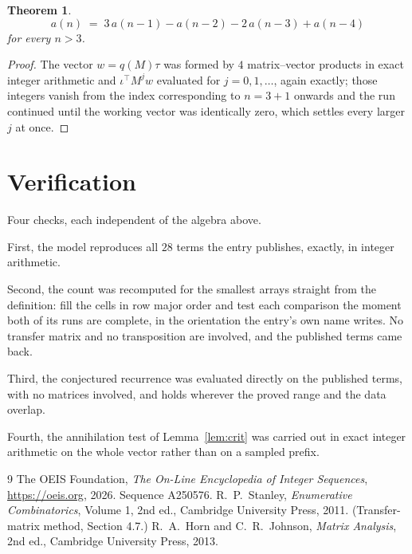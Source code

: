 \documentclass[11pt,a4paper]{article}
\theoremstyle{plain}
\newtheorem{theorem}{Theorem}
\theoremstyle{definition}
\begin{document}
\begin{theorem}
\[
a(n)\;=\;3\,a(n-1) - a(n-2) - 2\,a(n-3) + a(n-4)
\]
for every $n>3$.
\end{theorem}

\begin{proof}
The vector $w=q(M)\tau$ was formed by $4$ matrix--vector products in exact integer
arithmetic and $\iota^{\!\top}M^{j}w$ evaluated for $j=0,1,\dots$, again exactly; those
integers vanish from the index corresponding to $n=3+1$ onwards and the run continued
until the working vector was identically zero, which settles every larger $j$ at once.
\end{proof}

\section{Verification}

Four checks, each independent of the algebra above.

First, the model reproduces all $28$ terms the entry publishes, exactly, in integer
arithmetic.

Second, the count was recomputed for the smallest arrays straight from the definition: fill the
cells in row major order and test each comparison the moment both of its runs are complete,
in the orientation the entry's own name writes. No transfer matrix and no transposition are
involved, and the published terms came back.

Third, the conjectured recurrence was evaluated directly on the published terms, with no
matrices involved, and holds wherever the proved range and the data overlap.

Fourth, the annihilation test of Lemma~\ref{lem:crit} was carried out in exact integer
arithmetic on the whole vector rather than on a sampled prefix.

\begin{thebibliography}{9}
 The OEIS Foundation, \emph{The On-Line Encyclopedia of Integer
Sequences}, \url{https://oeis.org}, 2026. Sequence A250576.
 R.~P.~Stanley, \emph{Enumerative Combinatorics}, Volume 1, 2nd ed.,
Cambridge University Press, 2011. (Transfer-matrix method, Section 4.7.)
 R.~A.~Horn and C.~R.~Johnson, \emph{Matrix Analysis}, 2nd ed., Cambridge
University Press, 2013.
\end{thebibliography}
\end{document}
